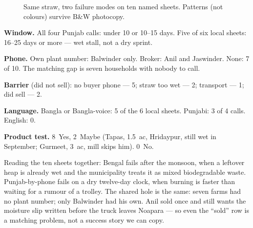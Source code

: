 \documentclass[12pt,a4paper]{article}
\begin{document}
\begin{figure}[h]
\centering
{}
\caption{Same straw, two failure modes on ten named sheets. Patterns (not colours) survive B\&W photocopy.}
\label{fig:fate}
\end{figure}

\textbf{Window.} All four Punjab calls: under 10 or 10--15 days. Five of six local sheets: 16--25 days or more --- wet stall, not a dry sprint.

\textbf{Phone.} Own plant number: Balwinder only. Broker: Anil and Jaswinder. None: 7 of 10. The matching gap is seven households with nobody to call.

\textbf{Barrier} (did not sell): no buyer phone --- 5; straw too wet --- 2; transport --- 1; did sell --- 2.

\textbf{Language.} Bangla or Bangla-voice: 5 of the 6 local sheets. Punjabi: 3 of 4 calls. English: 0.

\textbf{Product test.} 8~Yes, 2~Maybe (Tapas, 1.5~ac, Hridaypur, still wet in September; Gurmeet, 3~ac, mill skips him). 0~No.

Reading the ten sheets together: Bengal fails after the monsoon, when a leftover heap is already wet and the municipality treats it as mixed biodegradable waste. Punjab-by-phone fails on a dry twelve-day clock, when burning is faster than waiting for a rumour of a trolley. The shared hole is the same: seven farms had no plant number; only Balwinder had his own. Anil sold once and still wants the moisture slip written before the truck leaves Noapara --- so even the ``sold'' row is a matching problem, not a success story we can copy.
\end{document}
